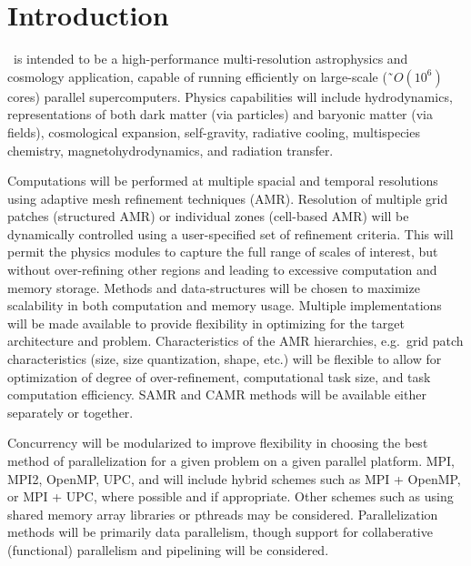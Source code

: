\documentclass{book}
\begin{document}

\chapter{Introduction} \label{s:intro}

   \cello\ is intended to be a high-performance multi-resolution
   astrophysics and cosmology application, capable of running
   efficiently on large-scale (\~{\ }$O(10^6)$ cores) parallel
   supercomputers.  Physics capabilities will include hydrodynamics,
   representations of both dark matter (via particles) and baryonic
   matter (via fields), cosmological expansion, self-gravity,
   radiative cooling, multispecies chemistry, magnetohydrodynamics,
   and radiation transfer.

   Computations will be performed at multiple spacial and temporal
   resolutions using adaptive mesh refinement techniques (AMR).
   Resolution of multiple grid patches (structured AMR) or individual
   zones (cell-based AMR) will be dynamically controlled using a
   user-specified set of refinement criteria.  This will permit the
   physics modules to capture the full range of scales of interest,
   but without over-refining other regions and leading to excessive
   computation and memory storage.  Methods and data-structures will
   be chosen to maximize scalability in both computation and memory
   usage.  Multiple implementations will be made available to provide
   flexibility in optimizing for the target architecture and problem.
   Characteristics of the AMR hierarchies, e.g.~grid patch
   characteristics (size, size quantization, shape, etc.) will be
   flexible to allow for optimization of degree of over-refinement,
   computational task size, and task computation efficiency.  SAMR and
   CAMR methods will be available either separately or together.
   

   Concurrency will be modularized to improve flexibility in choosing
   the best method of parallelization for a given problem on a given
   parallel platform.  MPI, MPI2, OpenMP, UPC, and will include hybrid
   schemes such as MPI + OpenMP, or MPI + UPC, where possible and if
   appropriate.  Other schemes such as using shared memory array
   libraries or pthreads may be considered.  Parallelization methods
   will be primarily data parallelism, though support for
   collaberative (functional) parallelism and pipelining will be
   considered.
\end{document}
